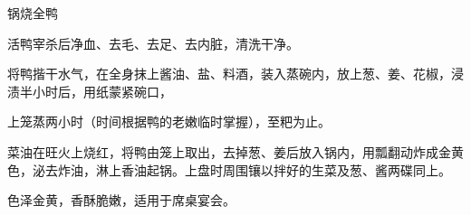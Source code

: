 \begin{recipe}{锅烧全鸭}

\ingredients


\cooking

\step 活鸭宰杀后净血、去毛、去足、去内脏，清洗干净。

\step 将鸭揩干水气，在全身抹上酱油、盐、料酒，装入蒸碗内，放上葱、姜、花椒，浸渍半小时后，用纸蒙紧碗口，

上笼蒸两小时（时间根据鸭的老嫩临时掌握），至粑为止。

\step 菜油在旺火上烧红，将鸭由笼上取出，去掉葱、姜后放入锅内，用瓢翻动炸成金黄色，泌去炸油，淋上香油起锅。上盘时周围镶以拌好的生菜及葱、酱两碟同上。

\notes

色泽金黄，香酥脆嫩，适用于席桌宴会。

\end{recipe}

